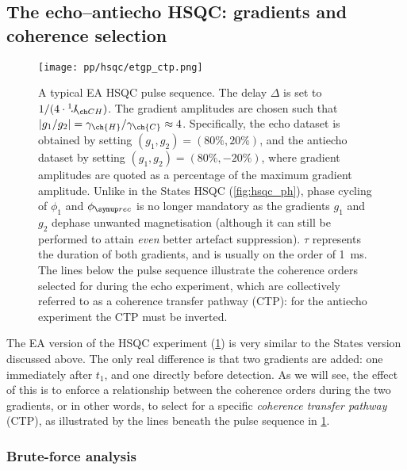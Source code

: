 \subsection{The echo--antiecho HSQC: gradients and coherence selection}
\label{subsec:theory__hsqc_ea}

\begin{figure}[!ht]
    \centering
    \texttt{[image: pp/hsqc/etgp\_ctp.png]}%
    \caption[Echo--antiecho HSQC pulse sequence]{
        A typical EA HSQC pulse sequence.
        The delay $\Delta$ is set to $1/(4 \cdot \oneJ{CH})$.
        The gradient amplitudes are chosen such that $|g_1/g_2| = \gamma_{\ch{H}}/\gamma_{\ch{C}} \approx 4$.
        Specifically, the echo dataset is obtained by setting $(g_1, g_2) = (80\%, 20\%)$, and the antiecho dataset by setting $(g_1, g_2) = (80\%, -20\%)$, where gradient amplitudes are quoted as a percentage of the maximum gradient amplitude.
        Unlike in the States HSQC (\cref{fig:hsqc_ph}), phase cycling of $\phi_1$ and $\phirec$ is no longer mandatory as the gradients $g_1$ and $g_2$ dephase unwanted magnetisation (although it can still be performed to attain \textit{even} better artefact suppression).
        $\tau$ represents the duration of both gradients, and is usually on the order of \qty{1}{ms}.
        The lines below the pulse sequence illustrate the coherence orders selected for during the echo experiment, which are collectively referred to as a coherence transfer pathway (CTP): for the antiecho experiment the \carbon{} CTP must be inverted.
    }
    \label{fig:hsqc_etgp}
\end{figure}

The EA version of the HSQC experiment (\cref{fig:hsqc_etgp}) is very similar to the States version discussed above.
The only real difference is that two gradients are added: one immediately after $t_1$, and one directly before detection.
As we will see, the effect of this is to enforce a relationship between the coherence orders during the two gradients, or in other words, to select for a specific \textit{coherence transfer pathway} (CTP), as illustrated by the lines beneath the pulse sequence in \cref{fig:hsqc_etgp}.


\subsubsection{Brute-force analysis}


